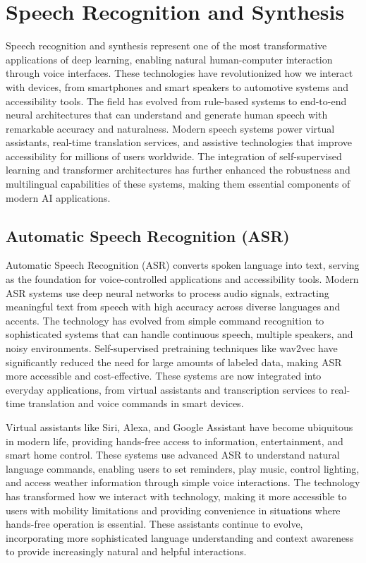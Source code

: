 
\section{Speech Recognition and Synthesis }
\label{sec:speech-applications}

Speech recognition and synthesis represent one of the most transformative applications of deep learning, enabling natural human-computer interaction through voice interfaces. These technologies have revolutionized how we interact with devices, from smartphones and smart speakers to automotive systems and accessibility tools. The field has evolved from rule-based systems to end-to-end neural architectures that can understand and generate human speech with remarkable accuracy and naturalness. Modern speech systems power virtual assistants, real-time translation services, and assistive technologies that improve accessibility for millions of users worldwide. The integration of self-supervised learning and transformer architectures has further enhanced the robustness and multilingual capabilities of these systems, making them essential components of modern AI applications.

\subsection{Automatic Speech Recognition (ASR)}

Automatic Speech Recognition (ASR) converts spoken language into text, serving as the foundation for voice-controlled applications and accessibility tools. Modern ASR systems use deep neural networks to process audio signals, extracting meaningful text from speech with high accuracy across diverse languages and accents. The technology has evolved from simple command recognition to sophisticated systems that can handle continuous speech, multiple speakers, and noisy environments. Self-supervised pretraining techniques like wav2vec have significantly reduced the need for large amounts of labeled data, making ASR more accessible and cost-effective. These systems are now integrated into everyday applications, from virtual assistants and transcription services to real-time translation and voice commands in smart devices.

Virtual assistants like Siri, Alexa, and Google Assistant have become ubiquitous in modern life, providing hands-free access to information, entertainment, and smart home control. These systems use advanced ASR to understand natural language commands, enabling users to set reminders, play music, control lighting, and access weather information through simple voice interactions. The technology has transformed how we interact with technology, making it more accessible to users with mobility limitations and providing convenience in situations where hands-free operation is essential. These assistants continue to evolve, incorporating more sophisticated language understanding and context awareness to provide increasingly natural and helpful interactions.

